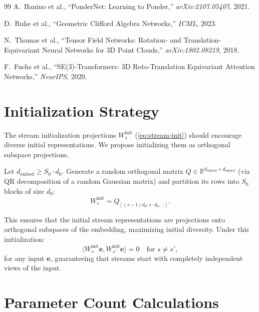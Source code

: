 \documentclass[11pt,a4paper]{article}
\theoremstyle{definition}
\theoremstyle{plain}
\theoremstyle{remark}
\newcommand{\R}{\mathbb{R}}
\begin{document}
\begin{thebibliography}{99}
A.~Banino et al., ``PonderNet: Learning to Ponder,'' 
\textit{arXiv:2107.05407}, 2021.

D.~Ruhe et al., ``Geometric Clifford Algebra Networks,'' 
\textit{ICML}, 2023.

N.~Thomas et al., ``Tensor Field Networks: Rotation- and 
Translation-Equivariant Neural Networks for 3D Point Clouds,'' 
\textit{arXiv:1802.08219}, 2018.

F.~Fuchs et al., ``SE(3)-Transformers: 3D Roto-Translation Equivariant 
Attention Networks,'' \textit{NeurIPS}, 2020.

\end{thebibliography}

\appendix

\section{Initialization Strategy}\label{sec:init}

The stream initialization projections $W_s^{\text{init}}$ 
(\cref{eq:stream-init}) should encourage diverse initial representations. 
We propose initializing them as orthogonal subspace projections.

Let $d_{\text{embed}} \geq S_0 \cdot d_0$. Generate a random orthogonal 
matrix $Q \in \R^{d_{\text{embed}} \times d_{\text{embed}}}$ (via QR 
decomposition of a random Gaussian matrix) and partition its rows into 
$S_0$ blocks of size $d_0$:
\begin{equation}
  W_s^{\text{init}} = Q_{[(s-1)d_0 : s \cdot d_0,\; :]}.
\end{equation}

This ensures that the initial stream representations are projections onto 
orthogonal subspaces of the embedding, maximizing initial diversity. Under 
this initialization:
\begin{equation}
  \langle W_s^{\text{init}} \mathbf{e}, W_{s'}^{\text{init}} 
  \mathbf{e}\rangle = 0 \quad \text{for } s \neq s',
\end{equation}
for any input $\mathbf{e}$, guaranteeing that streams start with 
completely independent views of the input.

\section{Parameter Count Calculations}\label{sec:param-calc}
\end{document}
